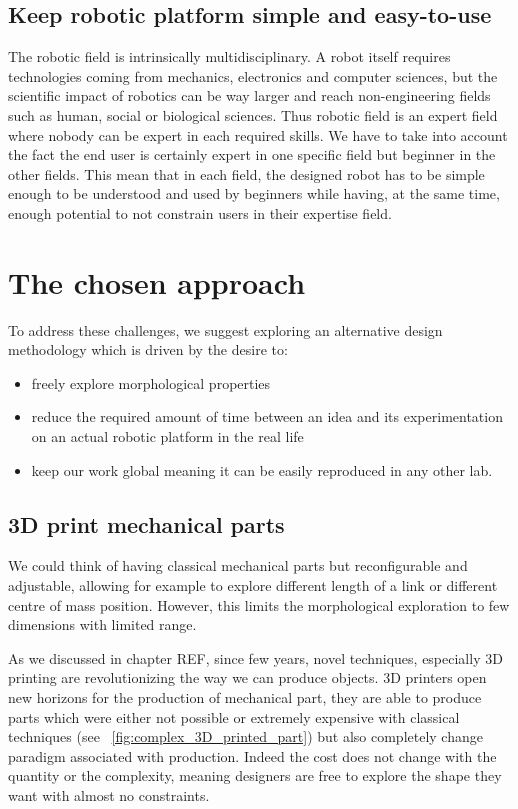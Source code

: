 
\subsection{Keep robotic platform simple and easy-to-use} %
The robotic field is intrinsically multidisciplinary. A robot itself requires technologies coming from mechanics, electronics and computer sciences, but the scientific impact of robotics can be way larger and reach non-engineering fields such as human, social or biological sciences. Thus robotic field is an expert field where nobody can be expert in each required skills.
We have to take into account the fact the end user is certainly expert in one specific field but beginner in the other fields. This mean that in each field, the designed robot has to be simple enough to be understood and used by beginners while having, at the same time, enough potential to not constrain users in their expertise field.


\section{The chosen approach} %

To address these challenges, we suggest exploring an alternative design methodology which is driven by the desire to:
\begin{itemize}
    \item freely explore morphological properties
    \item reduce the required amount of time between an idea and its experimentation on an actual robotic platform in the real life
    \item keep our work global meaning it can be easily reproduced in any other lab.
\end{itemize}


\subsection{3D print mechanical parts} %
We could think of having classical mechanical parts but reconfigurable and adjustable, allowing for example to explore different length of a link or different centre of mass position. However, this limits the morphological exploration to few dimensions with limited range.

As we discussed in chapter REF, since few years, novel techniques, especially 3D printing are revolutionizing the way we can produce objects. 3D printers open new horizons for the production of mechanical part, they are able to produce parts which were either not possible or extremely expensive with classical techniques (see \figurename~\ref{fig:complex_3D_printed_part}) but also completely change paradigm associated with production. Indeed the cost does not change with the quantity or the complexity, meaning designers are free to explore the shape they want with almost no constraints.


